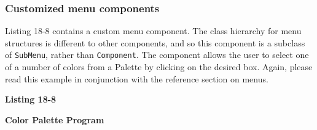 \subsubsection*{Customized menu components}

Listing 18-8 contains a custom menu component. The class hierarchy for
menu structures is different to other components, and so this component
is a subclass of \texttt{SubMenu}, rather than
\texttt{Component}. The component allows the user to select one of a
number of colors from a Palette by clicking on the desired box.
Again, please read this example in conjunction with the reference
section on menus.

\bigskip

{\sffamily\bfseries Listing 18-8}

{\sffamily\bfseries Color Palette Program}


